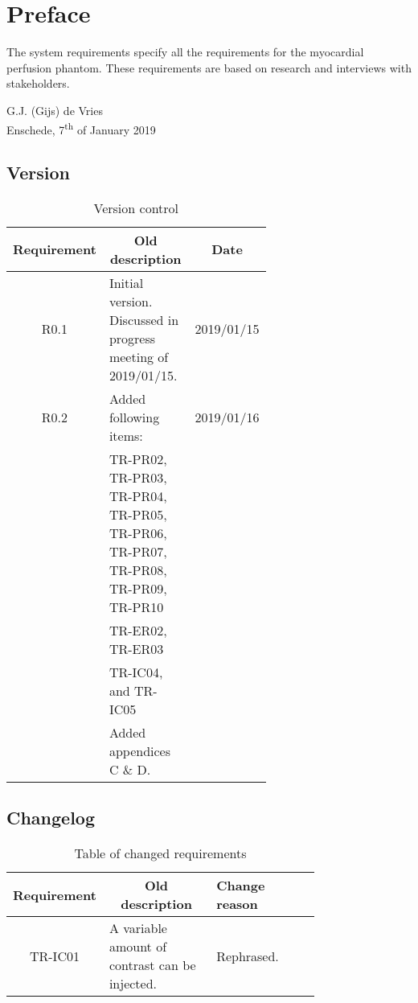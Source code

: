\chapter*{Preface}

\vskip-10pt
The system requirements specify all the requirements for the myocardial perfusion phantom. These requirements are based on research and interviews with stakeholders.

\vskip50pt
G.J. (Gijs) de Vries\\
Enschede, 7\textsuperscript{th} of January 2019

\section*{Version}
\begin{table} [h]
\caption{ Version control }
	\begin{tabular}{|c|p{0.64\linewidth}|l|}
		\multicolumn{1}{l}{\textbf{Requirement}} & \multicolumn{1}{c}{\textbf{Old description}} & \multicolumn{1}{c}{\textbf{Date}} \\
		\hline
		R0.1 & Initial version. Discussed in progress meeting of 2019/01/15. & 2019/01/15 \\
		R0.2 & 
			Added following items: & 2019/01/16 \\
		 	& \textbullet TR-PR02, TR-PR03, TR-PR04, TR-PR05, TR-PR06, TR-PR07, TR-PR08, TR-PR09, TR-PR10 & \\
		 	& \textbullet TR-ER02, TR-ER03 & \\
		 	& \textbullet TR-IC04, and TR-IC05 \\
		 	& \textbullet Added appendices C \& D. & \\
		\hline
	\end{tabular}
\end{table}

\section*{Changelog}

\begin{table} [h]
\caption{ Table of changed requirements }
	\begin{tabular}{|c|p{0.38\linewidth}|p{0.38\linewidth}|}
		\multicolumn{1}{l}{\textbf{Requirement}} & \multicolumn{1}{c}{\textbf{Old description}} & \multicolumn{1}{l}{\textbf{Change reason}} \\
		\hline
		TR-IC01 & A variable amount of contrast can be injected. & Rephrased. \\
		\hline
	\end{tabular}
\end{table}